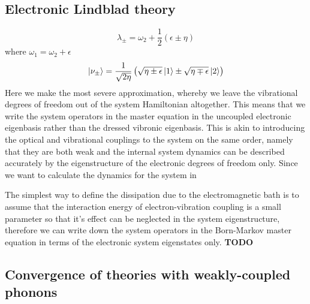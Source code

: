 \documentclass[]{article}
\begin{document}
\begin{itemize}
\begin{itemize}
\subsection{Electronic Lindblad theory}
\label{ssec:electronic}
\begin{equation}
\lambda_{\pm} = \omega_2 + \frac{1}{2}(\epsilon \pm \eta)
\end{equation}
where $\omega_1 = \omega_2 +\epsilon$
\begin{equation}
\ket{\nu_\pm} = \frac{1}{\sqrt{2\eta}}\left(\sqrt{\eta\pm\epsilon}\ket{1}\pm\sqrt{\eta\mp\epsilon}\ket{2}\right)
\end{equation}
Here we make the most severe approximation, whereby we leave the vibrational degrees of freedom out of the system Hamiltonian altogether. This means that we write the system operators in the master equation in the uncoupled electronic eigenbasis rather than the dressed vibronic eigenbasis. This is akin to introducing the optical and vibrational couplings to the system on the same order, namely that they are both weak and the internal system dynamics can be described accurately by the eigenstructure of the electronic degrees of freedom only. Since we want to calculate the dynamics for the system in

The simplest way to define the dissipation due to the electromagnetic bath is to assume that the interaction energy of electron-vibration coupling is a small parameter so that it's effect can be neglected in the system eigenstructure, therefore we can write down the system operators in the Born-Markov master equation in terms of the electronic system eigenstates only.
\textbf{TODO}
\subsection{Convergence of theories with weakly-coupled phonons}

\end{itemize}
\end{itemize}
\end{document}
